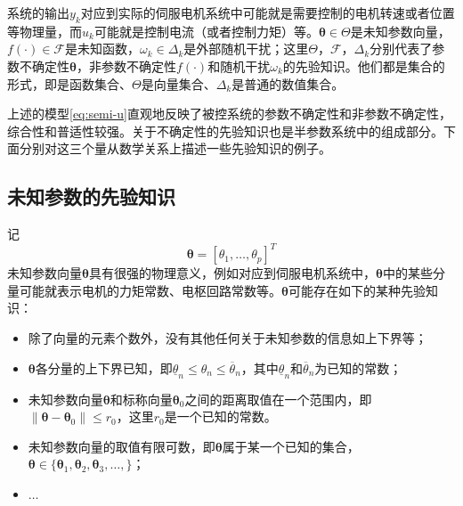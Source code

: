 系统的输出$y_{k}$对应到实际的伺服电机系统中可能就是需要控制的电机转速或者位置等物理量，而$u_k$可能就是控制电流（或者控制力矩）等。$\bm{\theta}\in\Theta$是未知参数向量，$f(\cdot)\in\mathcal{F}$是未知函数，$\omega_{k}\in\Delta_{k}$是外部随机干扰；这里$\Theta$，$\mathcal{F}$，$\Delta_{k}$分别代表了参数不确定性$\bm{\theta}$，非参数不确定性$f(\cdot)$和随机干扰$\omega_{k}$的先验知识。他们都是集合的形式，即是函数集合、$\Theta$是向量集合、$\Delta_{k}$是普通的数值集合。

上述的模型\eqref{eq:semi-u}直观地反映了被控系统的参数不确定性和非参数不确定性，综合性和普适性较强。关于不确定性的先验知识也是半参数系统中的组成部分。下面分别对这三个量从数学关系上描述一些先验知识的例子。
\subsection{未知参数的先验知识}
\label{subsec:2.2.2}
记
\begin{equation}%
\label{eq:}
\bm{\theta} = [\theta_{1},\ldots,\theta_{p}]^{T}
\end{equation}
未知参数向量$\bm{\theta}$具有很强的物理意义，例如对应到伺服电机系统中，$\bm{\theta}$中的某些分量可能就表示电机的力矩常数、电枢回路常数等。$\bm{\theta}$可能存在如下的某种先验知识：
\begin{itemize}
\item 除了向量的元素个数外，没有其他任何关于未知参数的信息如上下界等；
\item $\bm{\theta}$各分量的上下界已知，即$\underline{\theta}_{n}\leq\theta_{n}\leq\overline{\theta}_{n}$，其中$\underline{\theta}_{n}$和$\overline{\theta}_{n}$为已知的常数；
\item 未知参数向量$\bm{\theta}$和标称向量$\bm{\theta}_{0}$之间的距离取值在一个范围内，即$\|\bm{\theta}-\bm{\theta}_{0}\|\leq r_{0}$，这里$r_{0}$是一个已知的常数。
\item 未知参数向量的取值有限可数，即$\bm{\theta}$属于某一个已知的集合，$\bm{\theta}\in\{\bm{\theta}_{1},\bm{\theta}_{2},\bm{\theta}_{3},\dots,\}$；
\item $\dots$
\end{itemize}
